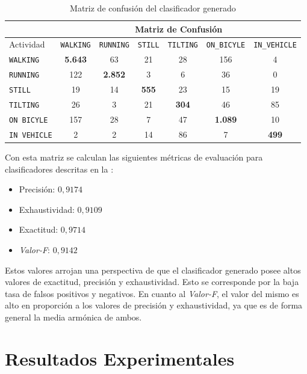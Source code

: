 \begin{table}[h]
\begin{centering}
\begin{tabular}{|l|c|c|c|c|c|c|}
\cline{2-7} 
\multicolumn{1}{l|}{} & \multicolumn{6}{c|}{Matriz de Confusión}\tabularnewline
\hline 
Actividad & \texttt{\footnotesize{}WALKING} & \texttt{\footnotesize{}RUNNING} & \texttt{\footnotesize{}STILL} & \texttt{\footnotesize{}TILTING} & \texttt{\footnotesize{}ON\_BICYLE} & \texttt{\footnotesize{}IN\_VEHICLE}\tabularnewline
\hline 
\hline 
\texttt{\footnotesize{}WALKING} & \textbf{5.643} & 63 & 21 & 28 & 156 & 4\tabularnewline
\hline 
\texttt{\footnotesize{}RUNNING} & 122 & \textbf{2.852} & 3 & 6 & 36 & 0\tabularnewline
\hline 
\texttt{\footnotesize{}STILL} & 19 & 14 & \textbf{555} & 23 & 15 & 19\tabularnewline
\hline 
\texttt{\footnotesize{}TILTING} & 26 & 3 & 21 & \textbf{304} & 46 & 85\tabularnewline
\hline 
\texttt{\footnotesize{}ON BICYLE} & 157 & 28 & 7 & 47 & \textbf{1.089} & 10\tabularnewline
\hline 
\texttt{\footnotesize{}IN VEHICLE} & 2 & 2 & 14 & 86 & 7 & \textbf{499}\tabularnewline
\hline 
\end{tabular}
\par\end{centering}
\caption{\label{tab6:matriz-confusion}Matriz de confusión del clasificador
generado}
\end{table}

Con esta matriz se calculan las siguientes métricas de evaluación
para clasificadores descritas en la :
\begin{itemize}
\item Precisión: $0,9174$
\item Exhaustividad: $0,9109$
\item Exactitud: $0,9714$
\item \emph{Valor-F}: $0,9142$
\end{itemize}
Estos valores arrojan una perspectiva de que el clasificador generado
posee altos valores de exactitud, precisión y exhaustividad. Esto
se corresponde por la baja tasa de falsos positivos y negativos. En
cuanto al \emph{Valor-F}, el valor del mismo es alto en proporción
a los valores de precisión y exhaustividad, ya que es de forma general
la media armónica de ambos.

\section{Resultados Experimentales}

